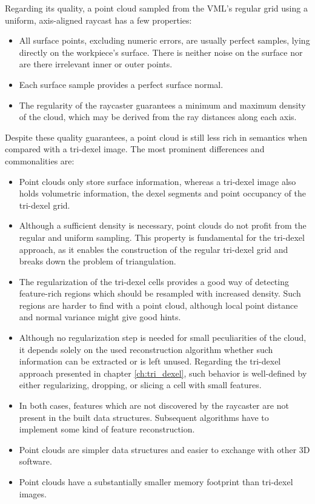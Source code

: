 Regarding its quality, a point cloud sampled from the VML's regular grid using a uniform, axis-aligned raycast has a few properties:
\begin{itemize}
	\item
	All surface points, excluding numeric errors, are usually perfect samples, lying directly on the workpiece's surface.
	There is neither noise on the surface nor are there irrelevant inner or outer points.
	\item
	Each surface sample provides a perfect surface normal.
	\item
	The regularity of the raycaster guarantees a minimum and maximum density of the cloud, which may be derived from the ray distances along each axis.
\end{itemize}

Despite these quality guarantees, a point cloud is still less rich in semantics when compared with a tri-dexel image.
The most prominent differences and commonalities are:
\begin{itemize}
	\item
	Point clouds only store surface information, whereas a tri-dexel image also holds volumetric information, \ie the dexel segments and point occupancy of the tri-dexel grid.
	\item
	Although a sufficient density is necessary, point clouds do not profit from the regular and uniform sampling.
	This property is fundamental for the tri-dexel approach, as it enables the construction of the regular tri-dexel grid and breaks down the problem of triangulation.
	\item
	The regularization of the tri-dexel cells provides a good way of detecting feature-rich regions which should be resampled with increased density.
	Such regions are harder to find with a point cloud, although local point distance and normal variance might give good hints.
	\item
	Although no regularization step is needed for small peculiarities of the cloud, it depends solely on the used reconstruction algorithm whether such information can be extracted or is left unused.
	Regarding the tri-dexel approach presented in chapter \ref{ch:tri_dexel}, such behavior is well-defined by either regularizing, \ie dropping, or slicing a cell with small features.
	\item
	In both cases, features which are not discovered by the raycaster are not present in the built data structures.
	Subsequent algorithms have to implement some kind of feature reconstruction.
	\item
	Point clouds are simpler data structures and easier to exchange with other 3D software.
	\item
	Point clouds have a substantially smaller memory footprint than tri-dexel images.
\end{itemize}


